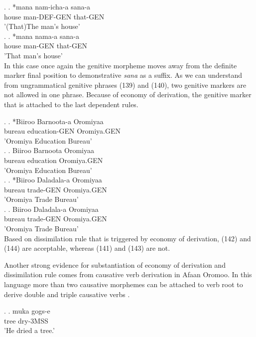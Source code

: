 \documentclass[11pt,a4paper]{article}
\begin{document}
	\ex.
	\ag.
	*mana nam-icha-a sana-a\\
	house man-DEF-GEN that-GEN\\
	'(That)The man's house'\\ 
	
		\ex.
	\ag.
	*mana nama-a sana-a\\
	house man-GEN that-GEN\\
	'That man's house'\\ 
	
	In this case once again the genitive morpheme moves away from the definite marker final position to demonstrative \emph{sana} as a suffix. As we can understand from ungrammatical genitive phrases (139) and (140), two genitive markers are not allowed in one phrase. Because of economy of derivation, the genitive marker that is attached to the last dependent rules. 
	
	
	\ex.
	\ag.
	*Biiroo Barnoota-a Oromiyaa\\
	bureau education-GEN Oromiya.GEN\\
	'Oromiya Education Bureau'\\
	
	\ex.
	\ag.
	Biiroo Barnoota Oromiyaa\\
	bureau education Oromiya.GEN\\
	'Oromiya Education Bureau'\\
	
	
	\ex.
	\ag.
	*Biiroo Daladala-a Oromiyaa\\
	bureau trade-GEN Oromiya.GEN\\
	'Oromiya Trade Bureau'\\
	
	\ex.
	\ag.
	Biiroo Daladala-a Oromiyaa\\
	bureau trade-GEN Oromiya.GEN\\
	'Oromiya Trade Bureau'\\
	
	Based on dissimilation rule that is triggered by economy of derivation, (142) and (144) are acceptable, whereas (141) and (143) are not. 
	
	Another strong evidence for substantiation of economy of derivation and dissimilation rule comes from causative verb derivation in Afaan Oromoo. In this language more than two causative morphemes can be attached to verb root to derive double and triple causative verbs . 
	
	\ex.
	\ag.
	muka gogs-e\\
	tree dry-3MSS\\
	'He dried a tree.'
	
\end{document}
